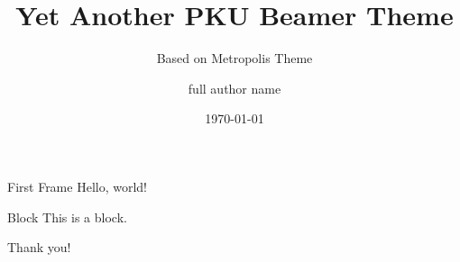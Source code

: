\documentclass[10pt]{beamer}
\title{Yet Another PKU Beamer Theme}
\subtitle{Based on Metropolis Theme}
\date{\today}
\author[short author name]{full author name}
\institute{institute}
\begin{document}
  \maketitle
  
  \begin{frame}{First Frame}
    Hello, world!
    \begin{block}{Block}
        This is a block.
    \end{block}
  \end{frame}
  
  \begin{frame}[standout]
    Thank you!
  \end{frame}
\end{document}
